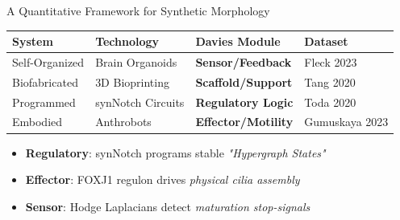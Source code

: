 \documentclass[aspectratio=169,11pt]{beamer}
\begin{document}
\begin{frame}{A Quantitative Framework for Synthetic Morphology}

\begin{table}
\centering
\small
\begin{tabular}{@{}llll@{}}
\toprule
\textbf{System} & \textbf{Technology} & \textbf{Davies Module} & \textbf{Dataset} \\ \midrule
\rowcolor{hgxblue!10} Self-Organized & Brain Organoids & \textbf{Sensor/Feedback} & Fleck 2023 \\
\rowcolor{pollengreen!10} Biofabricated & 3D Bioprinting & \textbf{Scaffold/Support} & Tang 2020 \\
\rowcolor{chooseviolet!10} Programmed & synNotch Circuits & \textbf{Regulatory Logic} & Toda 2020 \\
\rowcolor{bonfsig!10} Embodied & Anthrobots & \textbf{Effector/Motility} & Gumuskaya 2023 \\ \bottomrule
\end{tabular}
\end{table}

\begin{itemize}
    \item \textbf{Regulatory}: synNotch programs stable \textit{"Hypergraph States"}
    \item \textbf{Effector}: FOXJ1 regulon drives \textit{physical cilia assembly}
    \item \textbf{Sensor}: Hodge Laplacians detect \textit{maturation stop-signals}
\end{itemize}

\end{frame}

\end{document}
